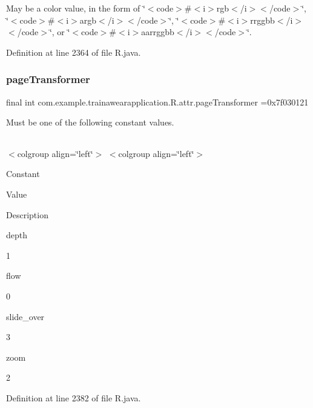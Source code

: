 May be a color value, in the form of \char`\"{}$<$code$>$\#$<$i$>$rgb$<$/i$>$$<$/code$>$\char`\"{}, \char`\"{}$<$code$>$\#$<$i$>$argb$<$/i$>$$<$/code$>$\char`\"{}, \char`\"{}$<$code$>$\#$<$i$>$rrggbb$<$/i$>$$<$/code$>$\char`\"{}, or \char`\"{}$<$code$>$\#$<$i$>$aarrggbb$<$/i$>$$<$/code$>$\char`\"{}. 

Definition at line 2364 of file R.\+java.

\mbox{\label{classcom_1_1example_1_1trainawearapplication_1_1_r_1_1attr_a301935b9eeb18e965ee5ec037a76aaf0}} 
\subsubsection{\texorpdfstring{pageTransformer}{pageTransformer}}
{\footnotesize\ttfamily final int com.\+example.\+trainawearapplication.\+R.\+attr.\+page\+Transformer =0x7f030121\hspace{0.3cm}{\ttfamily [static]}}

Must be one of the following constant values.

\tabulinesep=1mm
\begin{longtabu}spread 0pt [c]{*{0}{|X[-1]}|}
\hline
\end{longtabu}
$<$colgroup align=\char`\"{}left\char`\"{}$>$ $<$colgroup align=\char`\"{}left\char`\"{}$>$ 

Constant

Value

Description 

depth

1

flow

0

slide\+\_\+over

3

zoom

2

Definition at line 2382 of file R.\+java.

\mbox{\label{classcom_1_1example_1_1trainawearapplication_1_1_r_1_1attr_a87417a470d4f31d65b1631b95290f85a}} 
